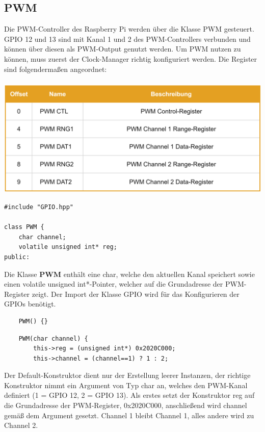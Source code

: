 \documentclass[12pt]{article}
\begin{document}
\subsection{PWM}
Die PWM-Controller des Raspberry Pi werden über die Klasse PWM gesteuert. GPIO 12 und 13 sind mit Kanal 1 und 2 des PWM-Controllers verbunden und können über diesen als PWM-Output genutzt werden. Um PWM nutzen zu können, muss zuerst der Clock-Manager richtig konfiguriert werden. Die Register sind folgendermaßen angeordnet:\\\\
\includegraphics[width=\textwidth]{img/pwm_table.png}
\begin{center}\end{center}\newpage
\begin{verbatim}
#include "GPIO.hpp"

class PWM {
    char channel;
    volatile unsigned int* reg;
public:
\end{verbatim}
Die Klasse $\textbf{PWM}$ enthält eine char, welche den aktuellen Kanal speichert sowie einen volatile unsigned int*-Pointer, welcher auf die Grundadresse der PWM-Register zeigt. Der Import der Klasse GPIO wird für das Konfigurieren der GPIOs benötigt.\\
\begin{verbatim}
    PWM() {}
\end{verbatim}
\begin{verbatim}
    PWM(char channel) {
        this->reg = (unsigned int*) 0x2020C000;
        this->channel = (channel==1) ? 1 : 2;
\end{verbatim}
Der Default-Konstruktor dient nur der Erstellung leerer Instanzen, der richtige Konstruktor nimmt ein Argument von Typ char an, welches den PWM-Kanal definiert (1 = GPIO 12, 2 = GPIO 13). Als erstes setzt der Konstruktor reg auf die Grundadresse der PWM-Register, 0x2020C000, anschließend wird channel gemäß dem Argument gesetzt. Channel 1 bleibt Channel 1, alles andere wird zu Channel 2.\\
\end{document}
